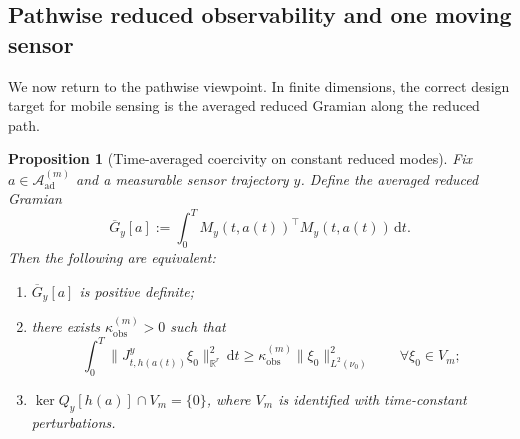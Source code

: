 \documentclass{article}
\newtheorem{proposition}[theorem]{Proposition}
\theoremstyle{definition}
\renewcommand{\d}{\mathrm{d}}
\begin{document}
\subsection{Pathwise reduced observability and one moving sensor}

We now return to the pathwise viewpoint. In finite dimensions, the correct design target for
mobile sensing is the averaged reduced Gramian along the reduced path.

\begin{proposition}[Time-averaged coercivity on constant reduced modes]
    \label{prop:finite-dimensional-constant-coercivity}
    Fix \(a\in \mathcal A_{\mathrm{ad}}^{(m)}\) and a measurable sensor trajectory \(y\). Define the
    averaged reduced Gramian
    \begin{equation}
        \label{eq:averaged-reduced-gramian}
        \overline G_y[a]
        :=
        \int_0^T M_y(t,a(t))^\top M_y(t,a(t))\,\d t.
    \end{equation}
    Then the following are equivalent:
    \begin{enumerate}
        \item \(\overline G_y[a]\) is positive definite;
        \item there exists \(\kappa_{\mathrm{obs}}^{(m)}>0\) such that
              \[
                  \int_0^T
                  \|J_{t,h(a(t))}^{y}\xi_0\|_{\mathbb R^r}^2\,\d t
                  \ge
                  \kappa_{\mathrm{obs}}^{(m)}\|\xi_0\|_{L^2(\nu_0)}^2
                  \qquad
                  \forall \xi_0\in V_m;
              \]
        \item \(\ker Q_y[h(a)]\cap V_m=\{0\}\), where \(V_m\) is identified with time-constant perturbations.
    \end{enumerate}
\end{proposition}
\end{document}
